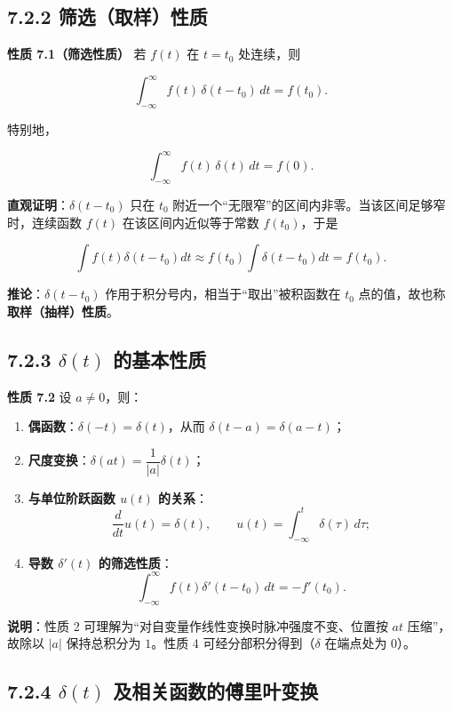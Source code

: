 \subsection{7.2.2
筛选（取样）性质}\label{ux7b5bux9009ux53d6ux6837ux6027ux8d28}

\textbf{性质 7.1（筛选性质）} 若 \(f(t)\) 在 \(t=t_0\) 处连续，则

\[
\int_{-\infty}^{\infty} f(t)\,\delta(t-t_0)\,dt=f(t_0).
\]

特别地，

\[
\int_{-\infty}^{\infty} f(t)\,\delta(t)\,dt=f(0).
\]

\textbf{直观证明}：\(\delta(t-t_0)\) 只在 \(t_0\)
附近一个``无限窄''的区间内非零。当该区间足够窄时，连续函数 \(f(t)\)
在该区间内近似等于常数 \(f(t_0)\)，于是

\[
\int f(t)\delta(t-t_0)dt\approx f(t_0)\int\delta(t-t_0)dt=f(t_0).
\]

\textbf{推论}：\(\delta(t-t_0)\)
作用于积分号内，相当于``取出''被积函数在 \(t_0\)
点的值，故也称\textbf{取样（抽样）性质}。

\subsection{\texorpdfstring{7.2.3 \(\delta(t)\)
的基本性质}{7.2.3 \textbackslash delta(t) 的基本性质}}\label{deltat-ux7684ux57faux672cux6027ux8d28}

\textbf{性质 7.2} 设 \(a\neq 0\)，则：

\begin{enumerate}
\def\labelenumi{\arabic{enumi}.}
\tightlist
\item
  \textbf{偶函数}：\(\delta(-t)=\delta(t)\)，从而
  \(\delta(t-a)=\delta(a-t)\)；
\item
  \textbf{尺度变换}：\(\delta(at)=\dfrac{1}{|a|}\delta(t)\)；
\item
  \textbf{与单位阶跃函数 \(u(t)\) 的关系}：
  \[\dfrac{d}{dt}u(t)=\delta(t),\qquad u(t)=\int_{-\infty}^{t}\delta(\tau)\,d\tau ;\]
\item
  \textbf{导数 \(\delta'(t)\) 的筛选性质}：
  \[\int_{-\infty}^{\infty}f(t)\delta'(t-t_0)\,dt=-f'(t_0).\]
\end{enumerate}

\textbf{说明}：性质 2 可理解为``对自变量作线性变换时脉冲强度不变、位置按
\(at\) 压缩''，故除以 \(|a|\) 保持总积分为 \(1\)。性质 4
可经分部积分得到（\(\delta\) 在端点处为 \(0\)）。

\subsection{\texorpdfstring{7.2.4 \(\delta(t)\)
及相关函数的傅里叶变换}{7.2.4 \textbackslash delta(t) 及相关函数的傅里叶变换}}\label{deltat-ux53caux76f8ux5173ux51fdux6570ux7684ux5085ux91ccux53f6ux53d8ux6362}

